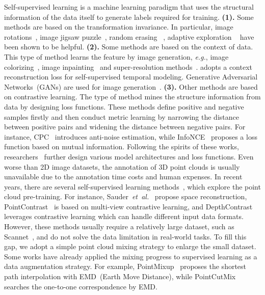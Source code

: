 \documentclass[journal]{IEEEtran}
\def\eg{\emph{e.g.}}
\def\etal{\emph{et~al.}}
\begin{document}
Self-supervised learning is a machine learning paradigm that uses the structural information of the data itself to generate labels required for training. \textbf{(1).} Some methods are based on the 
transformation invariance. In particular, image rotations~\cite{gidaris2018unsupervised}, image jigsaw puzzle~\cite{noroozi2016unsupervised}, random erasing~\cite{zhong2020random} , adaptive exploration ~\cite{ding2020adaptive} have been shown to be helpful. 
\textbf{(2).} Some methods are based on the context of data. This type of method learns the feature by image generation, \eg, image colorizing~\cite{zhang2016colorful}, image inpainting~\cite{2016Context} and super-resolution methods~\cite{2016Photo}. \cite{zhu2021temporal} adopts a context reconstruction loss for self-supervised temporal modeling.
Generative Adversarial Networks~(GANs) are used for image generation~\cite{2014Generative, zhu2017unpaired,zheng2019joint}. 
\textbf{(3).} Other methods are based on contrastive learning. The type of method mines the structure information from data by designing loss functions. These methods define positive and negative samples firstly and then conduct metric learning by narrowing the distance between positive pairs and widening the distance between negative pairs. For instance, CPC~\cite{oord2018representation} introduces anti-noise estimation, while InfoNCE~\cite{oord2018representation} proposes a loss function based on mutual information. Following the spirits of these works, researchers~\cite{chen2020simple,he2020momentum,han2020Self,grill2020Bootstrap,zbontar2021barlow} further design various model architectures and loss functions.
Even worse than 2D image datasets, the annotation of 3D point clouds is usually unavailable due to the annotation time costs and human expenses. In recent years, there are several self-supervised learning methods~\cite{zhang2019unsupervised, han2019multi, rao2020global, wang2020unsupervised1}, which explore the point cloud pre-training. For instance, Sauder~\etal~\cite{sauder2019self} propose space reconstruction, PointContrast~\cite{xie2020pointcontrast} is based on multi-view contrastive learning, and DepthContrast~\cite{zhang_depth_contrast} leverages contrastive learning which can handle different input data formats. 
However, these methods usually require a relatively large dataset, such as Scannet~\cite{dai2017scannet}, and do not solve the data limitation in real-world tasks. To fill this gap, we adopt a simple point cloud mixing strategy to enlarge the small dataset. Some works have already applied the mixing progress to supervised learning as a data augmentation strategy. For example, PointMixup~\cite{chen2020pointmixup} proposes the shortest path interpolation with EMD~(Earth Move Distance), while PointCutMix~\cite{zhang2021pointcutmix} searches the one-to-one correspondence by EMD. 
\end{document}
